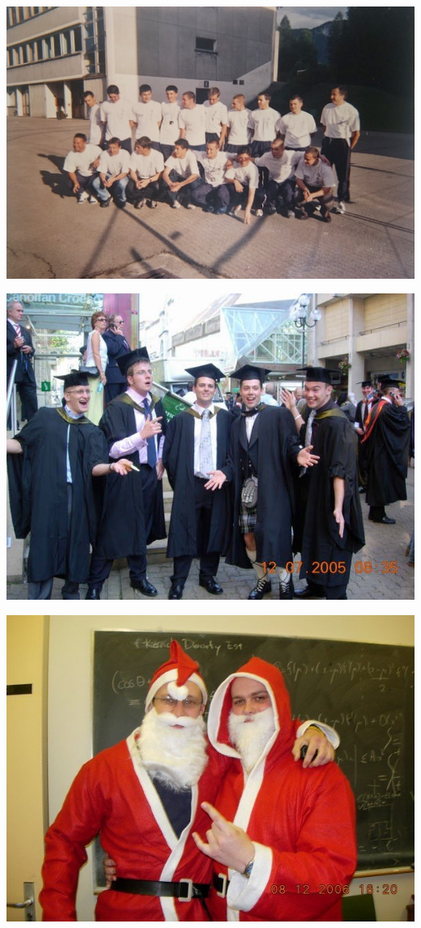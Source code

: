 \documentclass{beamer}
\begin{document}
\begin{frame}
    \begin{center}
        \includegraphics[width=.8\textwidth]{assets/high-school.jpg}
    \end{center}
\end{frame}

\begin{frame}
    \begin{center}
        \includegraphics[width=.8\textwidth]{assets/graduation.jpg}
    \end{center}
\end{frame}

\begin{frame}
    \begin{center}
        \includegraphics[width=.8\textwidth]{assets/phd.jpg}
    \end{center}
\end{frame}
\end{document}
